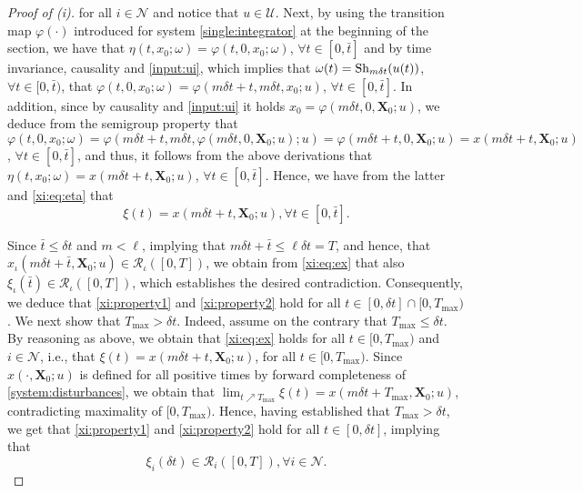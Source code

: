 \documentclass[reqno]{amsart}
\theoremstyle{plain}
\theoremstyle{definition}
\numberwithin{equation}{section}
\begin{document}
\begin{proof}[Proof of (i)]
\noindent for all $i\in{\ensuremath{\mathcal{N}}}$ and notice that $u\in{\ensuremath{\mathcal{U}}}$. Next, by using the transition map $\varphi(\cdot)$ introduced for system \eqref{single:integrator} at the beginning of the section, we have that $\eta(t,x_0;\omega)=\varphi(t,0,x_0;\omega)$, $\forall t\in[0,\bar{t}]$ and by time invariance, causality and \eqref{input:ui}, which implies that $\omega(t)={\rm Sh}_{m\delta t}(u(t))$, $\forall t\in[0,\bar{t})$, that $\varphi(t,0,x_0;\omega)=\varphi(m\delta t+t,m\delta t,x_0;u)$, $\forall t\in[0,\bar{t}]$. In addition, since by causality and \eqref{input:ui} it holds  $x_0=\varphi(m\delta t,0,{\textbf{{X}}}_0;u)$, we deduce from the semigroup property that $\varphi(t,0,x_0;\omega)=\varphi(m\delta t+t,m\delta t,\varphi(m\delta t,0,{\textbf{{X}}}_0;u);u)=\varphi(m\delta t+t,0,{\textbf{{X}}}_0;u)=x(m\delta t+t,{\textbf{{X}}}_0;u)$, $\forall t\in[0,\bar{t}]$, and thus, it follows from the above derivations that $\eta(t,x_0;\omega)=x(m\delta t+t,{\textbf{{X}}}_0;u)$, $\forall t\in[0,\bar{t}]$. Hence, we have from the latter and \eqref{xi:eq:eta} that  
\begin{equation} \label{xi:eq:ex}
\xi(t)=x(m\delta t+t,{\textbf{{X}}}_0;u), \forall t\in[0,\bar{t}].
\end{equation}

\noindent Since $\bar{t}\le\delta t$ and $m<\ell$, implying that $m\delta t+\bar{t}\le\ell\delta t=T$, and hence, that $x_{\iota}(m\delta t+\bar{t},{\textbf{{X}}}_0;u)\in{\ensuremath{\mathcal{R}}}_{\iota}([0,T])$, we obtain from \eqref{xi:eq:ex} that also $\xi_{\iota}(\bar{t})\in{\ensuremath{\mathcal{R}}}_{\iota}([0,T])$, which establishes the desired contradiction. Consequently, we deduce that \eqref{xi:property1} and \eqref{xi:property2} hold for all  $t\in[0,\delta t]\cap[0,T_{\max})$. We next show that $T_{\max}>\delta t$. Indeed, assume on the contrary that $T_{\max}\le\delta t$. By reasoning as above, we obtain that \eqref{xi:eq:ex} holds for all $t\in[0,T_{\max})$ and $i\in{\ensuremath{\mathcal{N}}}$, i.e., that $\xi(t)=x(m\delta t+t,{\textbf{{X}}}_0;u)$, for all $t\in[0,T_{\max})$. Since $x(\cdot,{\textbf{{X}}}_0;u)$ is defined for all positive times by forward completeness of \eqref{system:disturbances}, we obtain that $\lim_{t\nearrow T_{\max}}\xi(t)=x(m\delta t+T_{\max},{\textbf{{X}}}_0;u)$, contradicting maximality of $[0,T_{\max})$. Hence, having established that $T_{\max}>\delta t$, we get that \eqref{xi:property1} and \eqref{xi:property2} hold for all $t\in[0,\delta t]$, implying that 
\begin{equation} \label{xiatdeltat:inRi} 
\xi_i(\delta t)\in{\ensuremath{\mathcal{R}}}_i([0,T]),\forall i\in{\ensuremath{\mathcal{N}}}.
\end{equation}


\end{proof}
\end{document}

